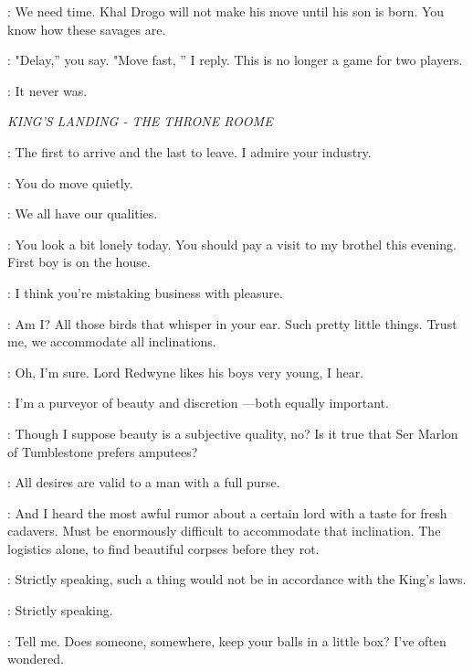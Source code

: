 \ILLYRIO: We need time. Khal Drogo will not make his move until his son is born. You know how these savages are. 

\VARYS: "Delay,'' you say. "Move fast, '' I reply. This is no longer a game for two players. 

\ILLYRIO: It never was. 



\scene

\textit{KING'S LANDING - THE THRONE ROOME} 


\VARYS: The first to arrive and the last to leave. I admire your industry. 

\LITTLEFINGER: You do move quietly. 

\VARYS: We all have our qualities. 

\LITTLEFINGER: You look a bit lonely today. You should pay a visit to my brothel this evening. First boy is on the house. 

\VARYS: I think you're mistaking business with pleasure. 

\LITTLEFINGER: Am I? All those birds that whisper in your ear.  Such pretty little things. Trust me, we accommodate all inclinations. 

\VARYS: Oh, I'm sure. Lord Redwyne likes his boys very young, I hear. 

\LITTLEFINGER: I'm a purveyor of beauty and discretion ---both equally important. 

\VARYS: Though I suppose beauty is a subjective quality, no? Is it true that Ser Marlon of Tumblestone prefers amputees? 

\LITTLEFINGER: All desires are valid to a man with a full purse. 

\VARYS: And I heard the most awful rumor about a certain lord with a taste for fresh cadavers. Must be enormously difficult to accommodate that inclination. The logistics alone, to find beautiful corpses before they rot. 

\LITTLEFINGER: Strictly speaking, such a thing would not be in accordance with the King's laws. 

\VARYS: Strictly speaking. 

\LITTLEFINGER: Tell me. Does someone, somewhere, keep your balls in a little box? I've often wondered. 

